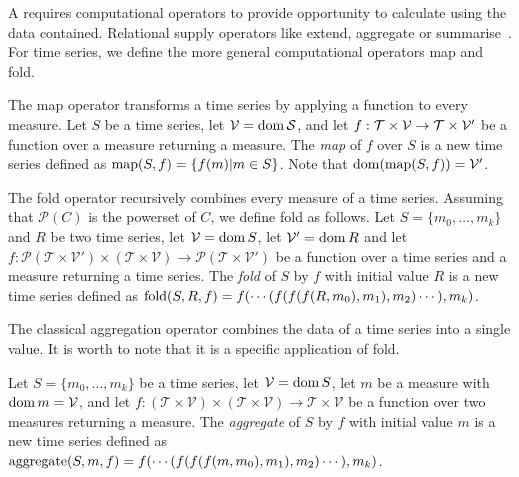 A  requires computational operators to provide opportunity
to calculate using the data contained. Relational  supply
operators like extend, aggregate or
summarise~\cite{date:introduction}. For time series, we define the more
general computational operators map and fold.

The map operator transforms a time series by applying a function to
every measure.  Let $S$ be a time series, let $\cal{V}=\operatorname{dom} S$, and
let $f:\cal{T}\times\cal{V}\rightarrow\cal{T}\times\cal{V'}$ be a
function over a measure returning a measure. The \emph{map} of $f$
over $S$ is a new time series defined as $\operatorname*{map}(S,f)=\{f(m)|m\in
S\}$. Note that $\operatorname{dom}(\operatorname*{map}(S,f))=\cal{V'}$.
%


The fold operator recursively combines every measure of a time
series. Assuming that $\mathcal{P}(C)$ is the powerset of $C$, we
define fold as follows.
%
Let $S=\{m_0,\dots, m_k\}$ and $R$ be two time series, let
$\mathcal{V}=\operatorname{dom} S$, let $\mathcal{V'}=\operatorname{dom} R$ and let 
%
$f:\mathcal{P}(\mathcal{T}\times\mathcal{V'}) \times (\mathcal{T}\times\mathcal{V}) \rightarrow \mathcal{P}(\mathcal{T}\times\mathcal{V'})$ 
%
be a function over a time series and a measure returning a time
series.
%
The \emph{fold} of $S$ by $f$ with initial value $R$ is a new time
series defined as $\operatorname*{fold}(S,R,f) = f(\cdots(f(f(f(R,m_0),\allowbreak
m_1),\allowbreak m_2)\cdots),\allowbreak m_k)$.
%


The classical aggregation operator combines the data of a time series
into a single value.  It is worth to note that it is a specific
application of fold.

Let $S=\{m_0,\dots,m_k\}$ be a time series, let $\mathcal{V}=\operatorname{dom} S$,
let $m$ be a measure with $\operatorname{dom} m=\mathcal{V}$, and let 
%
$f:(\mathcal{T}\times\mathcal{V})\times(\mathcal{T}\times\mathcal{V})\rightarrow \mathcal{T}\times\mathcal{V}$ 
%
be a function over two measures returning a measure. The
\emph{aggregate} of $S$ by $f$ with initial value $m$ is a new time
series defined as $\operatorname*{aggregate}(S,m,f) = f(\cdots(f(f(f(m,m_0),\allowbreak
m_1),\allowbreak m_2)\cdots),\allowbreak m_k)$.  


